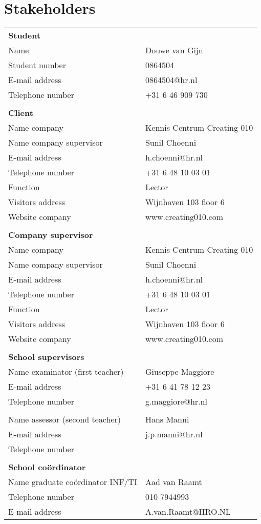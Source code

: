 \section{Stakeholders}
\begin{tabular} { l l }
    \textbf{Student} & \\
    Name & Douwe van Gijn \\
    Student number & 0864504 \\
    E-mail address & 0864504@hr.nl \\
    Telephone number & +31 6 46 909 730 \\
    & \\
    \textbf{Client} & \\
    Name company & Kennis Centrum Creating 010 \\
    Name company supervisor & Sunil Choenni \\
    E-mail address & h.choenni@hr.nl \\
    Telephone number & +31 6 48 10 03 01  \\
    Function & Lector \\
    Visitors address & Wijnhaven 103 floor 6 \\
    Website company & www.creating010.com \\
    & \\
    \textbf{Company supervisor} & \\
    Name company & Kennis Centrum Creating 010 \\
    Name company supervisor & Sunil Choenni \\
    E-mail address & h.choenni@hr.nl \\
    Telephone number & +31 6 48 10 03 01  \\
    Function & Lector \\
    Visitors address & Wijnhaven 103 floor 6 \\
    Website company & www.creating010.com \\
    & \\
    \textbf{School supervisors} & \\
    Name examinator (first teacher) & Giuseppe Maggiore \\
    E-mail address & +31 6 41 78 12 23 \\
    Telephone number & g.maggiore@hr.nl \\
    & \\
    Name assessor (second teacher) & Hans Manni \\
    E-mail address & j.p.manni@hr.nl \\
    Telephone number & \\
    & \\
    \textbf{School coördinator} & \\
    Name graduate coördinator INF/TI & Aad van Raamt \\
    Telephone number & 010 7944993 \\
    E-mail address & A.van.Raamt@HRO.NL \\
\end{tabular}
\newpage
